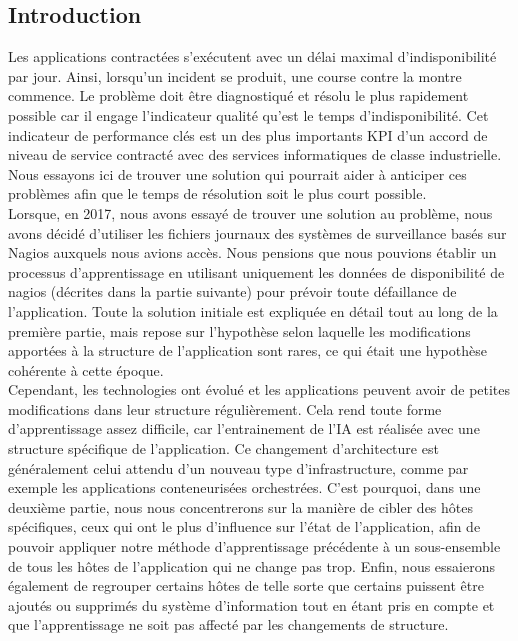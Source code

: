 \documentclass[10pt,a4paper,oneside]{article}
\begin{document}
\vspace{1.2cm}

\begin{multicols}{2}
\section{Introduction}
Les applications contractées s'exécutent avec un délai maximal d'indisponibilité par jour. Ainsi, lorsqu'un incident se produit, une course contre la montre commence. Le problème doit être diagnostiqué et résolu le plus rapidement possible car il engage l'indicateur qualité qu'est le temps d'indisponibilité. Cet  indicateur de performance clés est un des plus importants KPI d’un accord de niveau de service contracté avec des services informatiques de classe industrielle. Nous essayons ici de trouver une solution qui pourrait aider à anticiper ces problèmes afin que le temps de résolution soit le plus court possible.
\\
Lorsque, en 2017, nous avons essayé de trouver une solution au problème, nous avons décidé d'utiliser les fichiers journaux des systèmes de surveillance basés sur Nagios auxquels nous avions accès. Nous pensions que nous pouvions établir un processus d’apprentissage en utilisant uniquement les données de disponibilité de nagios (décrites dans la partie suivante) pour prévoir toute défaillance de l’application. Toute la solution initiale est expliquée en détail tout au long de la première partie, mais repose sur l'hypothèse selon laquelle les modifications apportées à la structure de l'application sont rares, ce qui était une hypothèse cohérente à cette époque.
\\ 
Cependant, les technologies ont évolué et les applications peuvent avoir de petites modifications dans leur structure régulièrement. Cela rend toute forme d'apprentissage assez difficile, car l'entrainement de l'IA est réalisée avec une structure spécifique de l'application. Ce changement d’architecture est généralement celui attendu d’un nouveau type d’infrastructure, comme par exemple les applications conteneurisées orchestrées. C’est pourquoi, dans une deuxième partie, nous nous concentrerons sur la manière de cibler des hôtes spécifiques, ceux qui ont le plus d’influence sur l’état de l’application, afin de pouvoir appliquer notre méthode d’apprentissage précédente à un sous-ensemble de tous les hôtes de l’application qui ne change pas trop. Enfin, nous essaierons également de regrouper certains hôtes de telle sorte que certains puissent être ajoutés ou supprimés du système d'information tout en étant pris en compte et que l'apprentissage ne soit pas affecté par les changements de structure.
\end{multicols}
\end{document}
